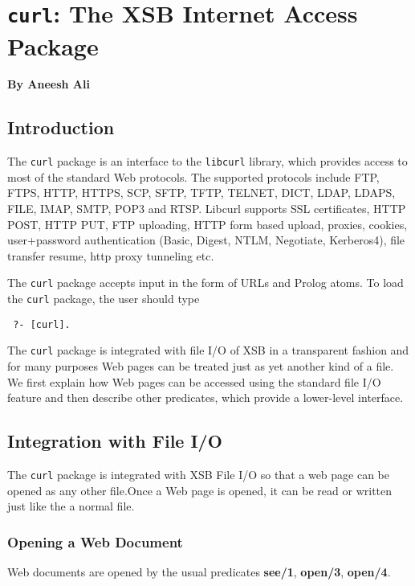 
\chapter{{\tt curl}: The XSB Internet Access Package}

  \begin{center}
    {\Large {\bf By Aneesh Ali}}
  \end{center}



\section{Introduction}

The {\tt curl} package is an interface to the {\tt libcurl}  library,
which provides access to most of the standard Web protocols.
The supported protocols include
FTP, FTPS, HTTP, HTTPS, SCP, SFTP, TFTP, TELNET, DICT, LDAP, LDAPS, FILE, IMAP, SMTP, POP3 and RTSP. Libcurl supports SSL certificates, HTTP POST, HTTP PUT, FTP uploading, HTTP form based upload, proxies, cookies, user+password authentication (Basic, Digest, NTLM, Negotiate, Kerberos4), file transfer resume, http proxy tunneling etc. 


The {\tt curl} package accepts input in the form of URLs and Prolog
atoms. To load the {\tt curl} package, the user should type
\begin{verbatim}
 ?- [curl].  
\end{verbatim}
The {\tt curl} package is integrated with file I/O of XSB in a transparent
fashion and for many purposes Web pages can be treated just as yet another
kind of a file. We first explain how Web pages can be accessed
using the standard file I/O feature and then describe other predicates,
which provide a lower-level interface.

\section{Integration with File I/O}

The {\tt curl} package is integrated with XSB File I/O so that a web page
can be opened as any other file.Once a Web page is opened, it can be read
or written just like the a normal file.


\subsection{Opening a Web Document}

Web documents are opened by the usual predicates {\bf see/1}, {\bf open/3},
{\bf open/4}.


